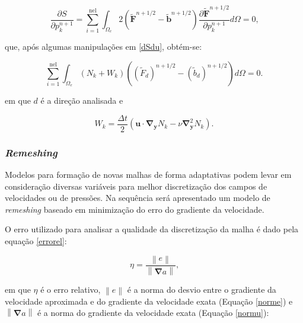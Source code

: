 \documentclass[_ArquivoPrincipal.tex]{subfiles}
\begin{document}
\begin{equation}
    \frac{\partial S}{\partial p_k^{n+1}}=\sum_{i=1}^{\mathrm{nel}}{\int_{\Omega_e}{2\left(\tilde{\mathbf{F}}^{n+1/2}-\tilde{\mathbf{b}}^{n+1/2}\right)\frac{\partial\tilde{\mathbf{F}}^{n+1/2}}{\partial p^{n+1}_k}d\Omega}}=0\text{,}
    \label{dSdp}
\end{equation}

\noindent que, após algumas manipulações em \ref{dSdu}, obtém-se:

\begin{equation}
    \sum_{i=1}^{\mathrm{nel}}{\int_{\Omega_e}{(N_k+W_k)\left((\tilde{F}_d)^{n+1/2}-(\tilde{b}_d)^{n+1/2}\right)d\Omega}}=0\text{.}
    \label{dSdu-2}
\end{equation}

\noindent em que $d$ é a direção analisada e

\begin{equation}
    W_k=\frac{\Delta t}{2}\left(\mathbf{u}\cdot\mathbf{\nabla}_\mathbf{y}N_k-\nu\mathbf{\nabla}_\mathbf{y}^2N_k\right)\text{.}
    \label{Wk}
\end{equation}

\subsubsection{\textit{Remeshing}} \label{ReE}

Modelos para formação de novas malhas de forma adaptativas podem levar em consideração diversas variáveis para melhor discretização dos campos de velocidades ou de pressões. Na sequência será apresentado um modelo de \textit{remeshing} baseado em minimização do erro do gradiente da velocidade.

O erro utilizado para analisar a qualidade da discretização da malha é dado pela equação \ref{errorel}:

\begin{equation}
    \eta=\frac{\left\lVert e\right\lVert}{\left\lVert\mathbf{\nabla}a\right\lVert}\text{,}
    \label{errorel}
\end{equation}

\noindent em que $\eta$ é o erro relativo, $\left\lVert e\right\lVert$ é a norma do desvio entre o gradiente da velocidade aproximada e do gradiente da velocidade exata (Equação \ref{norme}) e $\left\lVert\mathbf{\nabla}a\right\lVert$ é a norma do gradiente da velocidade exata (Equação \ref{normu}):
\end{document}
